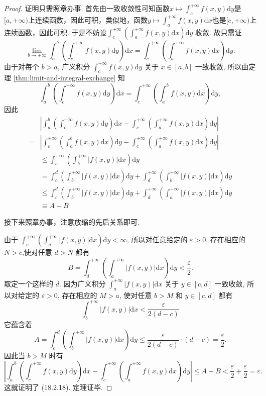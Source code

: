 \begin{proof}
    证明只需照章办事. 首先由一致收敛性可知函数$\displaystyle x\mapsto\int_c^{+\infty}f(x,y)\mathrm{d}y$是$[a,+\infty)$上连续函数，因此可积，类似地，函数$\displaystyle y\mapsto\int_a^{+\infty}f(x,y)\mathrm{d}x$也是$[c,+\infty)$上连续函数，因此可积. 于是不妨设$\int_c^{+\infty}\left(\int_a^{+\infty} f(x, y) \mathrm{d} x\right) \mathrm{d} y$ 收敛. 故只需证
    \begin{equation}
        \lim _{b \rightarrow+\infty} \int_a^b\left(\int_c^{+\infty} f(x, y) \mathrm{d} y\right) \mathrm{d} x=\int_c^{+\infty}\left(\int_a^{+\infty} f(x, y) \mathrm{d} x\right) \mathrm{d} y.
    \end{equation}
    由于对每个 $b>a$, 广义积分 $\int_c^{+\infty} f(x, y) \mathrm{d} y$ 关于 $x \in[a, b]$ 一致收敛, 所以由定理 \ref{thm:limit-and-integral-exchange} 知
$$
\int_a^b\left(\int_c^{+\infty} f(x, y) \mathrm{d} y\right) \mathrm{d} x=\int_c^{+\infty}\left(\int_a^b f(x, y) \mathrm{d} x\right) \mathrm{d} y,
$$
    因此
    $$
\begin{aligned}
& \left|\int_a^b\left(\int_c^{+\infty} f(x, y) \mathrm{d} y\right) \mathrm{d} x-\int_c^{+\infty}\left(\int_a^{+\infty} f(x, y) \mathrm{d} x\right) \mathrm{d} y\right| \\
= & \left|\int_c^{+\infty}\left(\int_a^b f(x, y) \mathrm{d} x\right) \mathrm{d} y-\int_c^{+\infty}\left(\int_a^{+\infty} f(x, y) \mathrm{d} x\right) \mathrm{d} y\right|\\
& \leqslant \int_c^{+\infty}\left(\int_b^{+\infty}|f(x, y)| \mathrm{d} x\right) \mathrm{d} y \\
& =\int_c^d\left(\int_b^{+\infty}|f(x, y)| \mathrm{d} x\right) \mathrm{d} y+\int_d^{+\infty}\left(\int_b^{+\infty}|f(x, y)| \mathrm{d} x\right) \mathrm{d} y \\
& \leqslant \int_c^d\left(\int_b^{+\infty}|f(x, y)| \mathrm{d} x\right) \mathrm{d} y+\int_d^{+\infty}\left(\int_a^{+\infty}|f(x, y)| \mathrm{d} x\right) \mathrm{d} y \\
& \equiv A+B
\end{aligned}
$$
\begin{note}
    接下来照章办事，注意放缩的先后关系即可.
\end{note}
由于 $\int_c^{+\infty}\left(\int_a^{+\infty}|f(x, y)| \mathrm{d} x\right) \mathrm{d} y<\infty$, 所以对任意给定的 $\varepsilon>0$, 存在相应的 $N>c$,使对任意 $d>N$ 都有
$$
B=\int_d^{+\infty}\left(\int_a^{+\infty}|f(x, y)| \mathrm{d} x\right) \mathrm{d} y<\frac{\varepsilon}{2} .
$$
取定一个这样的 $d$. 因为广义积分 $\int_a^{+\infty}|f(x, y)| \mathrm{d} x$ 关于 $y \in[c, d]$ 一致收敛, 所以对给定的 $\varepsilon>0$, 存在相应的 $M>a$, 使对任意 $b>M$ 和 $y \in[c, d]$ 都有
$$
\int_b^{+\infty}|f(x, y)| \mathrm{d} x<\frac{\varepsilon}{2(d-c)}
$$
它蕴含着
$$
A=\int_c^d\left(\int_b^{+\infty}|f(x, y)| \mathrm{d} x\right) \mathrm{d} y \leqslant \frac{\varepsilon}{2(d-c)} \cdot(d-c)=\frac{\varepsilon}{2} .
$$
因此当 $b>M$ 时有
$$
\left|\int_a^b\left(\int_c^{+\infty} f(x, y) \mathrm{d} y\right) \mathrm{d} x-\int_c^{+\infty}\left(\int_a^{+\infty} f(x, y) \mathrm{d} x\right) \mathrm{d} y\right| \leqslant A+B<\frac{\varepsilon}{2}+\frac{\varepsilon}{2}=\varepsilon .
$$
这就证明了 (18.2.18). 定理证毕.
\end{proof}
